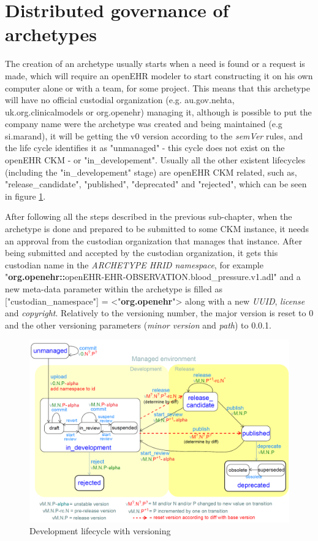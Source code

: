 \documentclass[mim_thesis.tex]{subfiles}
\begin{document}
\section{Distributed governance of archetypes}

The creation of an archetype usually starts when a need is found or a request is made, which will require an openEHR modeler to start constructing it on his own computer alone or with a team, for some project. This means that this archetype will have no official custodial organization (e.g. au.gov.nehta, uk.org.clinicalmodels or org.openehr) managing it, although is possible to put the company name were the archetype was created and being maintained (e.g si.marand), it will be getting the v0 version according to the \textit{semVer} rules, and the life cycle identifies it as "unmanaged" - this cycle does not exist on the openEHR CKM \citep{openehrckmgover2018} - or "in\_developement". Usually all the other existent lifecycles (including the "in\_developement" stage) are openEHR CKM related, such as, "release\_candidate", "published", "deprecated" and "rejected", which can be seen in figure \ref{fig:development_lifecycle_with_versioning}.

After following all the steps described in the previous sub-chapter, when the archetype is done and prepared to be submitted to some CKM instance, it needs an approval from the custodian organization that manages that instance. After being submitted and accepted by the custodian organization, it gets this custodian name in the \textit{ARCHETYPE HRID namespace}, for example "\textbf{org.openehr::}openEHR-EHR-OBSERVATION.blood\_pressure.v1.adl" and a new meta-data parameter within the archetype is filled as ["custodian\_namespace"] = <"\textbf{org.openehr}"> along with a new \textit{UUID}, \textit{license} and \textit{copyright}. Relatively to the versioning number, the major version is reset to 0 and the other versioning parameters (\textit{minor version} and \textit{path}) to 0.0.1. 

\begin{figure}[H]
	\centering
    \includegraphics[width=1\textwidth]{img/development_lifecycle_with_versioning.png}
	\caption{Development lifecycle with versioning \citep{openehrckmgover22018}}
	\label{fig:development_lifecycle_with_versioning}
\end{figure}
\end{document}
